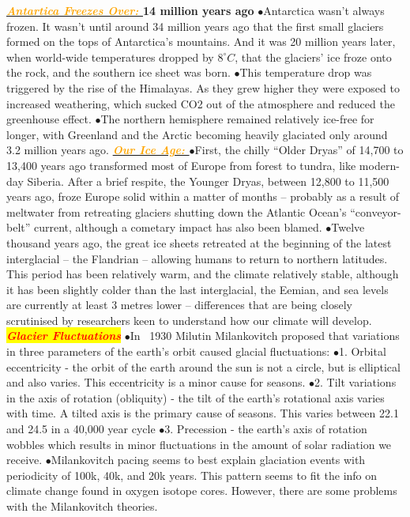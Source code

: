 \documentclass{article}
\newcommand{\ddd}{$\bullet$}
\newcommand{\red}[1]{\textcolor{red}{#1}}
\newcommand{\orange}[1]{\textcolor{orange}{#1}}
\newcommand{\mysection}[1]{\colorbox{yellow}{{\textbf{\textbf{\textit{\red{#1}}}}}}}
\newcommand{\mysub}[1]{\underline{\textbf{{\textit{\orange{#1}}}}}}
\begin{document}
\begin{multicols*}{4}
			\mysub{Antartica Freezes Over: }
				\textbf{14 million years ago}
				\ddd Antarctica wasn’t always frozen. It wasn’t until around 34 million years ago that the first small glaciers formed on the tops of Antarctica’s mountains. And it was 20 million years later, when world-wide temperatures dropped by $ 8^\circ C $, that the glaciers’ ice froze onto the rock, and the southern ice sheet was born.
				\ddd This temperature drop was triggered by the rise of the Himalayas. As they grew higher they were exposed to increased weathering, which sucked CO2 out of the atmosphere and reduced the greenhouse effect.
				\ddd The northern hemisphere remained relatively ice-free for longer, with Greenland and the Arctic becoming heavily glaciated only around 3.2 million years ago.
			\mysub{Our Ice Age: }
			\ddd First, the chilly “Older Dryas” of 14,700 to 13,400 years ago transformed most of Europe from forest to tundra, like modern-day Siberia. After a brief respite, the Younger Dryas, between 12,800 to 11,500 years ago, froze Europe solid within a matter of months – probably as a result of meltwater from retreating glaciers shutting down the Atlantic Ocean’s “conveyor-belt” current, although a cometary impact has also been blamed.
			\ddd Twelve thousand years ago, the great ice sheets retreated at the beginning of the latest interglacial – the Flandrian – allowing humans to return to northern latitudes. This period has been relatively warm, and the climate relatively stable, although it has been slightly colder than the last interglacial, the Eemian, and sea levels are currently at least 3 metres lower – differences that are being closely scrutinised by researchers keen to understand how our climate will develop.
     \mysection{Glacier Fluctuations}
	        \ddd In ~1930 Milutin Milankovitch proposed that variations in three parameters of the earth's orbit caused glacial fluctuations: 
	        \ddd 1.	Orbital eccentricity - the orbit of the earth around the sun is not a circle, but is elliptical and also varies. This eccentricity is a minor cause for seasons.
	        \ddd 2.	Tilt variations in the axis of rotation (obliquity) - the tilt of the earth's rotational axis varies with time. A tilted axis is the primary cause of seasons. This varies between 22.1 and 24.5 in a 40,000 year cycle
	        \ddd 3.	Precession - the earth's axis of rotation wobbles which results in minor fluctuations in the amount of solar radiation we receive.
	        \ddd Milankovitch pacing seems to best explain glaciation events with periodicity of 100k, 40k, and 20k years. This pattern seems to fit the info on climate change found in oxygen isotope cores. However, there are some problems with the Milankovitch theories.

\end{multicols*}
\end{document}
